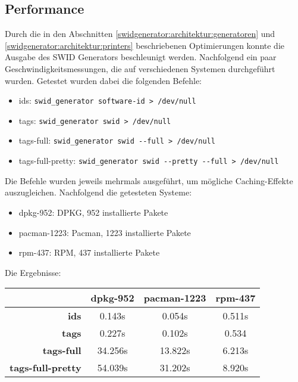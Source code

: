 \subsection{Performance}

Durch die in den Abschnitten \ref{swidgenerator:architektur:generatoren} und
\ref{swidgenerator:architektur:printers} beschriebenen Optimierungen konnte die
Ausgabe des SWID Generators beschleunigt werden. Nachfolgend ein paar
Geschwindigkeitsmessungen, die auf verschiedenen Systemen durchgeführt wurden.
Getestet wurden dabei die folgenden Befehle:

\begin{itemize}
	\item ids: \texttt{swid\_generator software-id > /dev/null}
	\item tags: \texttt{swid\_generator swid > /dev/null}
	\item tags-full: \texttt{swid\_generator swid -{}-full > /dev/null}
	\item tags-full-pretty: \texttt{swid\_generator swid -{}-pretty -{}-full > /dev/null}
\end{itemize}

Die Befehle wurden jeweils mehrmals ausgeführt, um mögliche Caching-Effekte
auszugleichen. Nachfolgend die getesteten Systeme:

\begin{itemize}
	\item dpkg-952: DPKG, 952 installierte Pakete
	\item pacman-1223: Pacman, 1223 installierte Pakete
	\item rpm-437: RPM, 437 installierte Pakete
\end{itemize}

Die Ergebnisse:

\begin{tabularx}{\textwidth}{rCCC}
	& \textbf{dpkg-952} & \textbf{pacman-1223} & \textbf{rpm-437} \\
	\hline
	\textbf{ids} & 0.143s & 0.054s & 0.511s \\
	\hline
	\textbf{tags} & 0.227s & 0.102s & 0.534\\
	\hline
	\textbf{tags-full} & 34.256s & 13.822s & 6.213s \\
	\hline
	\textbf{tags-full-pretty} & 54.039s & 31.202s & 8.920s \\
	\hline
\end{tabularx}

\vspace{1em}

